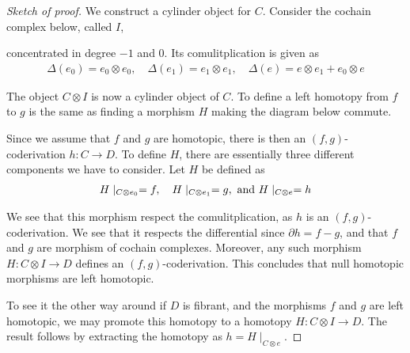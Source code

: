 \documentclass[../thesis.tex]{subfiles}
\begin{document}
    \begin{proof}[Sketch of proof]
        We construct a cylinder object for $C$. Consider the cochain complex below, called $I$,
        \begin{center}
        \end{center}
        concentrated in degree $-1$ and $0$. Its comulitplication is given as
        \begin{align*}
            \Delta(e_0) = e_0 \otimes e_0, \quad \Delta(e_1) = e_1 \otimes e_1, \quad \Delta(e) = e \otimes e_1 + e_0 \otimes e
        \end{align*}

        The object $C \otimes I$ is now a cylinder object of $C$. To define a left homotopy from $f$ to $g$ is the same as finding a morphism $H$ making the diagram below commute.
        \begin{center}
        \end{center}

        Since we assume that $f$ and $g$ are homotopic, there is then an $(f,g)$-coderivation $h : C \rightarrow D$. To define $H$, there are essentially three different components we have to consider. Let $H$ be defined as
        \begin{align*}
            H\mid_{C \otimes e_0} = f, \quad H\mid_{C \otimes e_1} = g,\tt{ and }H\mid_{C \otimes e} = h
        \end{align*}

        We see that this morphism respect the comulitplication, as $h$ is an $(f,g)$-coderivation. We see that it respects the differential since $\partial h = f - g$, and that $f$ and $g$ are morphism of cochain complexes. Moreover, any such morphism $H : C \otimes I \rightarrow D$ defines an $(f,g)$-coderivation. This concludes that null homotopic morphisms are left homotopic.

        To see it the other way around if $D$ is fibrant, and the morphisms $f$ and $g$ are left homotopic, we may promote this homotopy to a homotopy $H : C \otimes I \rightarrow D$. The result follows by extracting the homotopy as $h = H\mid_{C \otimes e}$.
    \end{proof}
\end{document}
